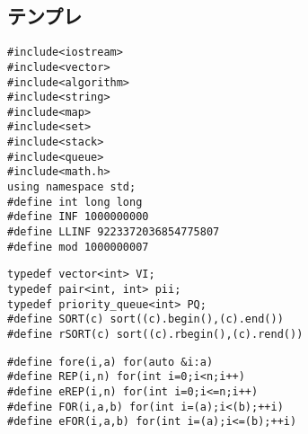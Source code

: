 \documentclass{jsarticle}
\begin{document}
\subsection*{テンプレ}
\begin{lstlisting}[caption=テンプレ]
#include<iostream>
#include<vector>
#include<algorithm>
#include<string>
#include<map>
#include<set>
#include<stack>
#include<queue>
#include<math.h>
using namespace std;
#define int long long
#define INF 1000000000
#define LLINF 9223372036854775807
#define mod 1000000007
\end{lstlisting}
\begin{lstlisting}[caption=alias]
typedef vector<int> VI;
typedef pair<int, int> pii;
typedef priority_queue<int> PQ;
#define SORT(c) sort((c).begin(),(c).end())
#define rSORT(c) sort((c).rbegin(),(c).rend())
\end{lstlisting}
\begin{lstlisting}[caption=ループ]
#define fore(i,a) for(auto &i:a)
#define REP(i,n) for(int i=0;i<n;i++)
#define eREP(i,n) for(int i=0;i<=n;i++)
#define FOR(i,a,b) for(int i=(a);i<(b);++i)
#define eFOR(i,a,b) for(int i=(a);i<=(b);++i)
\end{lstlisting}
\end{document}
